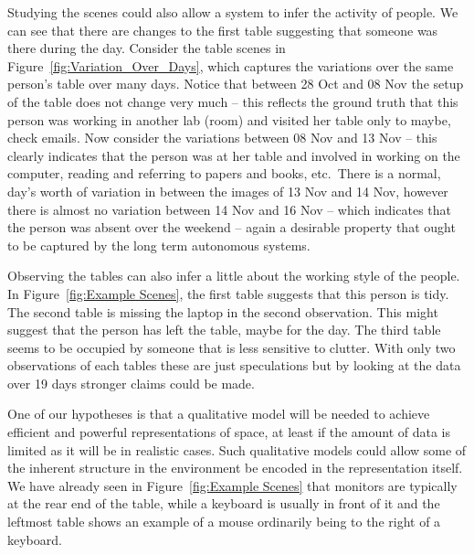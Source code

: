 \documentclass[letterpaper, 10 pt, conference]{ieeeconf}
\begin{document}
Studying the scenes could also allow a system to 
infer the activity of people. We can see that there are changes to the first table 
suggesting that someone was there during the day. Consider the table scenes in 
Figure~\ref{fig:Variation_Over_Days}, which captures the variations over the same person's
table over many days. Notice that between 28 Oct and 08 Nov the setup of the table does 
not change very much -- this reflects the ground truth that this person was working in 
another lab (room) and visited her table only to maybe, check emails. Now 
consider the variations between 08 Nov and 13 Nov -- this clearly indicates 
that the person was at her table and involved in working on the computer, 
reading and referring to papers and books, etc.\ There is a normal, day's 
worth of variation in between the images of 13 Nov and 14 Nov, however there 
is almost no variation between 14 Nov and 16 Nov -- which indicates that the 
person was absent over the weekend -- again a desirable property that ought 
to be captured by the long term autonomous systems.

Observing the tables can also infer a little about the working style of the 
people. In Figure~\ref{fig:Example Scenes}, the first table suggests that 
this person is tidy. The second table is missing the laptop in the second 
observation. This might suggest that 
the person has left the table, maybe for the day. The third table seems to 
be occupied by someone that is less sensitive to 
clutter. With only two observations of each tables these are just 
speculations but by looking at the data over 19 days stronger claims could be made.

One of our hypotheses is that a qualitative model will be needed to achieve 
efficient and powerful representations of 
space, at least if the amount of data is limited as it will be in realistic 
cases. Such qualitative models could allow some of the inherent 
structure in the environment be encoded in the representation itself. We 
have already seen in Figure~\ref{fig:Example Scenes} that monitors 
are typically at the rear end of the table, while a keyboard is usually in front of it and the 
leftmost table shows an example of a mouse ordinarily being to the right of a keyboard. 
\end{document}
